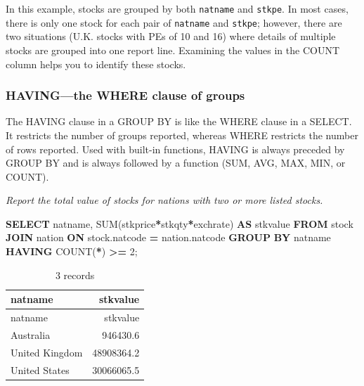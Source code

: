 \documentclass[
]{article}
\newenvironment{Shaded}{\begin{snugshade}}{\end{snugshade}}
\newcommand{\DecValTok}[1]{\textcolor[rgb]{0.00,0.00,0.81}{#1}}
\newcommand{\FunctionTok}[1]{\textcolor[rgb]{0.00,0.00,0.00}{#1}}
\newcommand{\KeywordTok}[1]{\textcolor[rgb]{0.13,0.29,0.53}{\textbf{#1}}}
\newcommand{\NormalTok}[1]{#1}
\newcommand{\OperatorTok}[1]{\textcolor[rgb]{0.81,0.36,0.00}{\textbf{#1}}}
\begin{document}
In this example, stocks are grouped by both \texttt{natname} and
\texttt{stkpe}. In most cases, there is only one stock for each pair of
\texttt{natname} and \texttt{stkpe}; however, there are two situations
(U.K. stocks with PEs of 10 and 16) where details of multiple stocks are
grouped into one report line. Examining the values in the COUNT column
helps you to identify these stocks.

\hypertarget{havingthe-where-clause-of-groups}{%
\subsubsection{HAVING---the WHERE clause of
groups}\label{havingthe-where-clause-of-groups}}

The HAVING clause in a GROUP BY is like the WHERE clause in a SELECT. It
restricts the number of groups reported, whereas WHERE restricts the
number of rows reported. Used with built-in functions, HAVING is always
preceded by GROUP BY and is always followed by a function (SUM, AVG,
MAX, MIN, or COUNT).

\emph{Report the total value of stocks for nations with two or more
listed stocks.}

\begin{Shaded}
\begin{Highlighting}[]
\KeywordTok{SELECT}\NormalTok{ natname, }\FunctionTok{SUM}\NormalTok{(stkprice}\OperatorTok{*}\NormalTok{stkqty}\OperatorTok{*}\NormalTok{exchrate) }\KeywordTok{AS}\NormalTok{ stkvalue}
    \KeywordTok{FROM}\NormalTok{ stock }\KeywordTok{JOIN}\NormalTok{ nation }\KeywordTok{ON}\NormalTok{ stock.natcode }\OperatorTok{=}\NormalTok{ nation.natcode}
        \KeywordTok{GROUP} \KeywordTok{BY}\NormalTok{ natname}
            \KeywordTok{HAVING} \FunctionTok{COUNT}\NormalTok{(}\OperatorTok{*}\NormalTok{) }\OperatorTok{\textgreater{}=} \DecValTok{2}\NormalTok{;}
\end{Highlighting}
\end{Shaded}

\begin{longtable}[]{@{}lr@{}}
\caption{3 records}\tabularnewline
\toprule()
natname & stkvalue \\
\midrule()
\endfirsthead
\toprule()
natname & stkvalue \\
\midrule()
\endhead
Australia & 946430.6 \\
United Kingdom & 48908364.2 \\
United States & 30066065.5 \\
\bottomrule()
\end{longtable}
\end{document}
